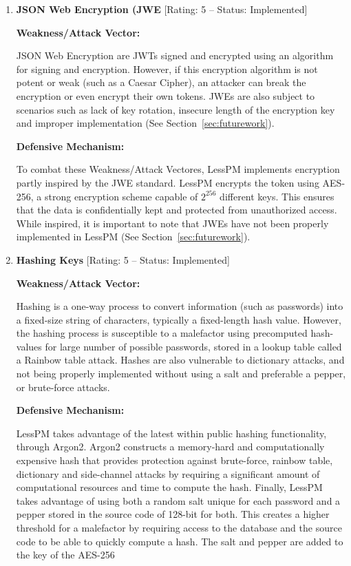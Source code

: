 \begin{enumerate}[label=$\blacktriangleright$]
  \item \textbf{JSON Web Encryption (JWE} [Rating: 5 -- Status: Implemented]

  \textbf{Weakness/Attack Vector:}

  JSON Web Encryption are JWTs signed and encrypted using an algorithm for
  signing and encryption.
  However, if this encryption algorithm is not potent or weak (such as a
  Caesar Cipher), an attacker can break the encryption or even encrypt their own
  tokens.
  JWEs are also subject to scenarios such as lack of key rotation, insecure
  length of the encryption key and improper implementation (See
  Section~\ref{sec:futurework}).

  \textbf{Defensive Mechanism:}

  To combat these Weakness/Attack Vectores, LessPM implements encryption partly inspired by
  the JWE standard.
  LessPM encrypts the token using AES-256, a strong encryption scheme capable
  of $2^{256}$ different keys.
  This ensures that the data is confidentially kept and protected from
  unauthorized access.
  While inspired, it is important to note that JWEs have not been properly
  implemented in LessPM (See Section~\ref{sec:futurework}).

  \item \textbf{Hashing Keys} [Rating: 5 -- Status: Implemented]

  \textbf{Weakness/Attack Vector:}

  Hashing is a one-way process to convert information (such as passwords)
  into a fixed-size string of characters, typically a fixed-length hash value.
  However, the hashing process is susceptible to a malefactor using
  precomputed hash-values for large number of possible passwords, stored in a
  lookup table called a Rainbow table attack.
  Hashes are also vulnerable to dictionary attacks, and not being properly
  implemented without using a salt and preferable a pepper, or brute-force
  attacks.

  \textbf{Defensive Mechanism:}

  LessPM takes advantage of the latest within public hashing functionality,
  through Argon2.
  Argon2 constructs a memory-hard and computationally expensive hash that
  provides protection against brute-force, rainbow table, dictionary and
  side-channel attacks by requiring a significant amount of computational
  resources and time to compute the hash.
  Finally, LessPM takes advantage of using both a random salt unique for each
  password and a pepper stored in the source code of 128-bit for both.
  This creates a higher threshold for a malefactor by requiring access to the
  database and the source code to be able to quickly compute a hash.
  The salt and pepper are added to the key of the AES-256


\end{enumerate}
